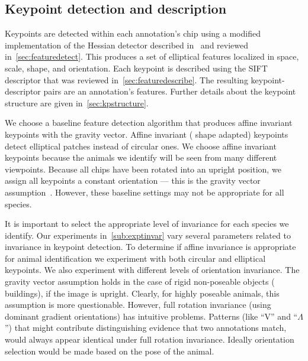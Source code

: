     \subsection{Keypoint detection and description}

        Keypoints are detected within each annotation's chip using a modified implementation of the Hessian
        detector described in~\cite{perdoch_efficient_2009} and reviewed in~\cref{sec:featuredetect}. This produces
        a set of elliptical features localized in space, scale, shape, and orientation. Each keypoint is described
        using the SIFT~\cite{lowe_distinctive_2004} descriptor that was reviewed in~\cref{sec:featuredescribe}. The
        resulting keypoint-descriptor pairs are an annotation's features. Further details about the keypoint
        structure are given in~\cref{sec:kpstructure}.

        We choose a baseline feature detection algorithm that produces affine invariant keypoints with the gravity
        vector. Affine invariant (\ie{} shape adapted) keypoints detect elliptical patches instead of circular
        ones. We choose affine invariant keypoints because the animals we identify will be seen from many different
        viewpoints. Because all chips have been rotated into an upright position, we assign all keypoints a
        constant orientation --- this is the gravity vector assumption~\cite{perdoch_efficient_2009}. However,
        these baseline settings may not be appropriate for all species.

        It is important to select the appropriate level of invariance for each species we identify.
        Our experiments in~\cref{sub:exptinvar} vary several parameters related to invariance in keypoint
        detection. To determine if affine invariance is appropriate for animal identification we experiment with
        both circular and elliptical keypoints.
        We also experiment with different levels of orientation invariance. The gravity vector assumption holds in
        the case of rigid non-poseable objects (\eg{} buildings), if the image is upright. Clearly, for highly
        poseable animals, this assumption is more questionable. However, full rotation invariance (using dominant
        gradient orientations) has intuitive problems. Patterns (like ``V'' and ``$\Lambda$'') that might
        contribute distinguishing evidence that two annotations match, would always appear identical under full
        rotation invariance. Ideally orientation selection would be made based on the pose of the animal.

